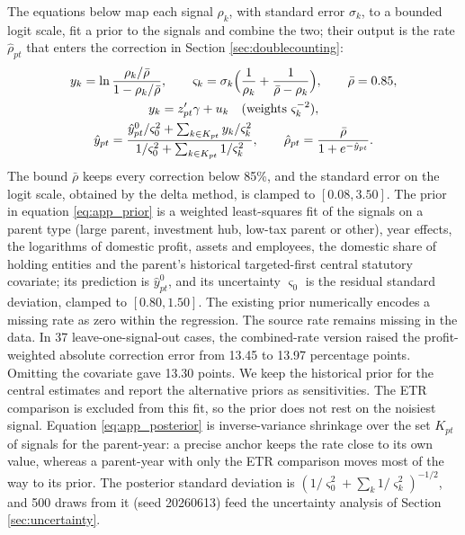 \documentclass[11pt,a4paper]{article}
\begin{document}
The equations below map each signal $\rho_k$, with standard error $\sigma_k$, to a bounded logit scale, fit a prior to the signals and combine the two; their output is the rate $\hat\rho_{pt}$ that enters the correction in Section \ref{sec:doublecounting}:
\begin{gather}
y_k=\ln\frac{\rho_k/\bar\rho}{1-\rho_k/\bar\rho},\qquad
\varsigma_k=\sigma_k\Bigl(\frac{1}{\rho_k}+\frac{1}{\bar\rho-\rho_k}\Bigr),\qquad \bar\rho=0.85,\label{eq:app_logit}\\
y_k=z_{pt}'\gamma+u_k\quad\text{(weights }\varsigma_k^{-2}\text{)},\label{eq:app_prior}\\
\hat y_{pt}=\frac{\hat y^{0}_{pt}/\varsigma_{0}^{2}+\sum_{k\in K_{pt}}y_k/\varsigma_k^{2}}{1/\varsigma_{0}^{2}+\sum_{k\in K_{pt}}1/\varsigma_k^{2}},\qquad
\hat\rho_{pt}=\frac{\bar\rho}{1+e^{-\hat y_{pt}}}.\label{eq:app_posterior}
\end{gather}
The bound $\bar\rho$ keeps every correction below 85\%, and the standard error on the logit scale, obtained by the delta method, is clamped to $[0.08,3.50]$. The prior in equation \eqref{eq:app_prior} is a weighted least-squares fit of the signals on a parent type (large parent, investment hub, low-tax parent or other), year effects, the logarithms of domestic profit, assets and employees, the domestic share of holding entities and the parent's historical targeted-first central statutory covariate; its prediction is $\hat y^{0}_{pt}$, and its uncertainty $\varsigma_0$ is the residual standard deviation, clamped to $[0.80,1.50]$. The existing prior numerically encodes a missing rate as zero within the regression. The source rate remains missing in the data. In 37 leave-one-signal-out cases, the combined-rate version raised the profit-weighted absolute correction error from 13.45 to 13.97 percentage points. Omitting the covariate gave 13.30 points. We keep the historical prior for the central estimates and report the alternative priors as sensitivities. The ETR comparison is excluded from this fit, so the prior does not rest on the noisiest signal. Equation \eqref{eq:app_posterior} is inverse-variance shrinkage over the set $K_{pt}$ of signals for the parent-year: a precise anchor keeps the rate close to its own value, whereas a parent-year with only the ETR comparison moves most of the way to its prior. The posterior standard deviation is $(1/\varsigma_0^{2}+\sum_{k}1/\varsigma_k^{2})^{-1/2}$, and 500 draws from it (seed 20260613) feed the uncertainty analysis of Section \ref{sec:uncertainty}.
\end{document}
